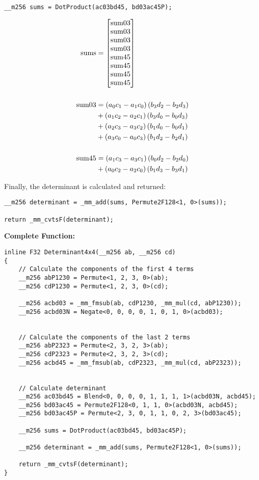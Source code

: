 \begin{verbatim}
__m256 sums = DotProduct(ac03bd45, bd03ac45P);
\end{verbatim}
\begin{align*}
\mathrm{sums} 
&=
\begin{bmatrix}
\mathrm{sum03}\\
\mathrm{sum03}\\
\mathrm{sum03}\\
\mathrm{sum03}\\
\mathrm{sum45}\\
\mathrm{sum45}\\
\mathrm{sum45}\\
\mathrm{sum45}\\
\end{bmatrix}\\
\\
\mathrm{sum03}
&=\left(a_0c_1 - a_1c_0\right)\left(b_3d_2 - b_2d_3\right)\\
&+\left(a_1c_2 - a_2c_1\right)\left(b_3d_0 - b_0d_3\right)\\
&+\left(a_2c_3 - a_3c_2\right)\left(b_1d_0 - b_0d_1\right)\\
&+\left(a_3c_0 - a_0c_3\right)\left(b_1d_2 - b_2d_1\right)\\
\\
\mathrm{sum45}
&=\left(a_1c_3 - a_3c_1\right)\left(b_0d_2 - b_2d_0\right)\\
&+\left(a_0c_2 - a_2c_0\right)\left(b_1d_3 - b_3d_1\right)
\end{align*}

Finally, the determinant is calculated and returned:
\begin{verbatim}
__m256 determinant = _mm_add(sums, Permute2F128<1, 0>(sums));

return _mm_cvtsF(determinant);
\end{verbatim}



\vspace{1cm}
\textbf{Complete Function:}
\begin{verbatim}
inline F32 Determinant4x4(__m256 ab, __m256 cd)
{
    // Calculate the components of the first 4 terms
    __m256 abP1230 = Permute<1, 2, 3, 0>(ab);
    __m256 cdP1230 = Permute<1, 2, 3, 0>(cd);

    __m256 acbd03 = _mm_fmsub(ab, cdP1230, _mm_mul(cd, abP1230));
    __m256 acbd03N = Negate<0, 0, 0, 0, 1, 0, 1, 0>(acbd03);


    // Calculate the components of the last 2 terms
    __m256 abP2323 = Permute<2, 3, 2, 3>(ab);
    __m256 cdP2323 = Permute<2, 3, 2, 3>(cd);
    __m256 acbd45 = _mm_fmsub(ab, cdP2323, _mm_mul(cd, abP2323));


    // Calculate determinant
    __m256 ac03bd45 = Blend<0, 0, 0, 0, 1, 1, 1, 1>(acbd03N, acbd45);
    __m256 bd03ac45 = Permute2F128<0, 1, 1, 0>(acbd03N, acbd45);
    __m256 bd03ac45P = Permute<2, 3, 0, 1, 1, 0, 2, 3>(bd03ac45);

    __m256 sums = DotProduct(ac03bd45, bd03ac45P);

    __m256 determinant = _mm_add(sums, Permute2F128<1, 0>(sums));

    return _mm_cvtsF(determinant);
}
\end{verbatim}




